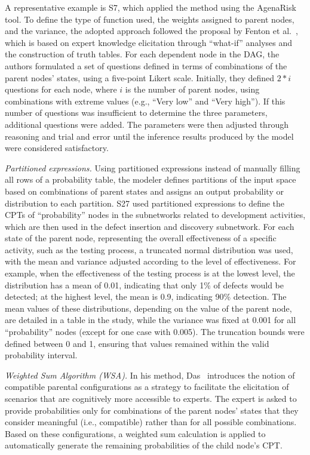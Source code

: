 A representative example is S7, which applied the method using the AgenaRisk tool. To define the type of function used, the weights assigned to parent nodes, and the variance, the adopted approach followed the proposal by Fenton et al.~\cite{fenton2007using}, which is based on expert knowledge elicitation through ``what-if'' analyses and the construction of truth tables. For each dependent node in the DAG, the authors formulated a set of questions defined in terms of combinations of the parent nodes' states, using a five-point Likert scale. Initially, they defined $2*i$ questions for each node, where $i$ is the number of parent nodes, using combinations with extreme values (e.g., ``Very low'' and ``Very high''). If this number of questions was insufficient to determine the three parameters, additional questions were added. The parameters were then adjusted through reasoning and trial and error until the inference results produced by the model were considered satisfactory.

\textit{Partitioned expressions.} Using partitioned expressions instead of manually filling all rows of a probability table, the modeler defines partitions of the input space based on combinations of parent states and assigns an output probability or distribution to each partition. S27 used partitioned expressions to define the CPTs of ``probability'' nodes in the subnetworks related to development activities, which are then used in the defect insertion and discovery subnetwork. For each state of the parent node, representing the overall effectiveness of a specific activity, such as the testing process, a truncated normal distribution was used, with the mean and variance adjusted according to the level of effectiveness. For example, when the effectiveness of the testing process is at the lowest level, the distribution has a mean of 0.01, indicating that only 1\% of defects would be detected; at the highest level, the mean is 0.9, indicating 90\% detection. The mean values of these distributions, depending on the value of the parent node, are detailed in a table in the study, while the variance was fixed at 0.001 for all ``probability'' nodes (except for one case with 0.005). The truncation bounds were defined between 0 and 1, ensuring that values remained within the valid probability interval.

\textit{Weighted Sum Algorithm (WSA).} In his method, Das~\cite{das2004generating} introduces the notion of compatible parental configurations as a strategy to facilitate the elicitation of scenarios that are cognitively more accessible to experts. The expert is asked to provide probabilities only for combinations of the parent nodes' states that they consider meaningful (i.e., compatible) rather than for all possible combinations. Based on these configurations, a weighted sum calculation is applied to automatically generate the remaining probabilities of the child node's CPT.

